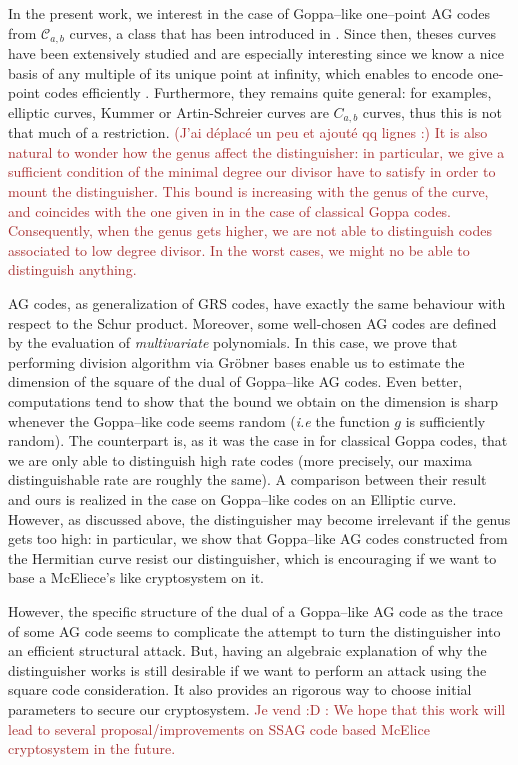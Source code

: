 \documentclass[a4paper]{article}
\theoremstyle{definition}
\theoremstyle{remark}
\newcommand{\calC}{\mathcal{C}}
\newcommand\mathieu[1]{\textcolor{brown}{#1}}
\begin{document}
In the present work, we interest in the case of Goppa--like one--point AG codes from $\calC_{a,b}$ curves, a class that has been introduced in \cite{Miu93}. Since then, theses curves have been extensively studied and are especially interesting since we know a nice basis of any multiple of its unique point at infinity, which enables to encode one-point codes efficiently \cite{BRS21}. Furthermore, they remains quite general: for examples, elliptic curves, Kummer or Artin-Schreier curves are $C_{a,b}$ curves, thus this is not that much of a restriction. \mathieu{(J'ai déplacé un peu et ajouté qq lignes :) It is also natural to wonder how the genus affect the distinguisher: in particular, we give a sufficient condition of the minimal degree our divisor have to satisfy in order to mount the distinguisher. This bound is increasing with the genus of the curve, and coincides with the one given in \cite{MT21} in the case of classical Goppa codes. Consequently, when the genus gets higher, we are not able to distinguish codes associated to low degree divisor. In the worst cases, we might no be able to distinguish anything.}

AG codes, as generalization of GRS codes, have exactly the same behaviour with respect to the Schur product. Moreover, some well-chosen AG codes are defined by the evaluation of \textit{multivariate} polynomials. In this case, we prove that performing division algorithm via Gröbner bases enable us to estimate the dimension of the square of the dual of Goppa--like AG codes. Even better, computations tend to show that the bound we obtain on the dimension is sharp whenever the Goppa--like code seems random (\emph{i.e} the function $g$ is sufficiently random). The counterpart is, as it was the case in \cite{MT21} for classical Goppa codes, that we are only able to distinguish high rate codes (more precisely, our maxima distinguishable rate are roughly the same). A comparison between their result and ours is realized in the case on Goppa--like codes on an Elliptic curve. However, as discussed above, the distinguisher may become irrelevant if the genus gets too high: in particular, we show that Goppa--like AG codes constructed from the Hermitian curve resist our distinguisher, which is encouraging if we want to base a McEliece's like cryptosystem on it.

However, the specific structure of the dual of a Goppa--like AG code as the trace of some AG code seems to complicate the attempt to turn the distinguisher into an efficient structural attack. But, having an algebraic explanation of why the distinguisher works is still desirable if we want to perform an attack using the square code consideration. It also provides an rigorous way to choose initial parameters to secure our cryptosystem.
\mathieu{Je vend :D : We hope that this work will lead to several proposal/improvements on SSAG code based McElice cryptosystem in the future.}
\end{document}
